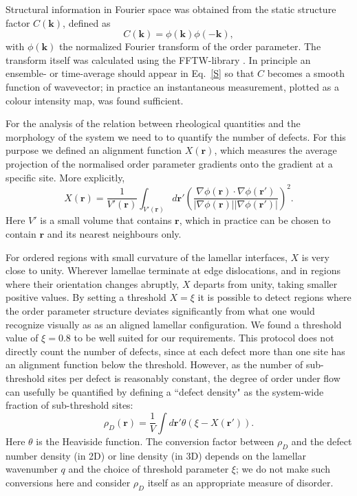 \documentclass[8.5pt,twoside,twocolumn]{article}
\begin{document}
Structural information in Fourier space was obtained from the static structure factor $C({\mathbf k})$, defined as
%
\begin{equation}
C({\mathbf k})=\phi({\mathbf k})\phi(-{\mathbf k}),
\label{S}\end{equation}
%
with $\phi({\mathbf k})$ the normalized Fourier transform of the order parameter.
The transform itself was calculated using the FFTW-library \cite{FFTW}.
In principle an ensemble- or time-average should appear in Eq.~\ref{S} so that $C$ becomes a smooth function of wavevector; in practice an instantaneous measurement, plotted as a colour intensity map, was found sufficient.

For the analysis of the relation between rheological quantities and the morphology of the system we need to to quantify the number of defects.
For this purpose we defined an alignment function $X({\mathbf r})$, which measures the average projection of the normalised order parameter gradients onto the gradient at a specific site.
More explicitly, 
%
\begin{equation}\label{alignment}
X({\mathbf r})=\frac{1}{V'({\mathbf r})} \int_{V'({\mathbf r})} d{\mathbf r'} \left(\frac{\nabla \phi ({\mathbf r}) \cdot \nabla \phi ({\mathbf r'})}{|\nabla\phi ({\mathbf r}) ||\nabla\phi ({\mathbf r'}) |}\right)^2. 
\end{equation}
%
Here $V'$ is a small volume that contains $\mathbf r$, which in practice can be chosen to contain $\mathbf r$ and its nearest neighbours only.

For ordered regions with small curvature of the lamellar interfaces, $X$ is very close to unity. Wherever lamellae terminate at edge dislocations, and in regions where their orientation changes abruptly, $X$ departs from unity, taking smaller positive values.
By setting a threshold $X=\xi$ it is possible to detect regions where the order parameter structure deviates significantly from what one would recognize visually as as an aligned lamellar configuration.
We found a threshold value of $\xi=0.8$ to be well suited for our requirements. This protocol does not directly count the number of defects, since at each defect more than one site has an alignment function below the threshold.
However, as the number of sub-threshold sites per defect is reasonably constant, the degree of order under flow can usefully be quantified by defining a ``defect density" as the system-wide fraction of sub-threshold sites:
%
\begin{equation}\label{defect density}
\rho_D({\mathbf r})=\frac{1}{V} \int d{\mathbf r'} \theta(\xi-X(\mathbf r')).  
\end{equation}
%
Here $\theta$ is the Heaviside function. The conversion factor between $\rho_D$ and the defect number density (in 2D) or line density (in 3D) depends on the lamellar wavenumber $q$ and the choice of threshold parameter $\xi$; we do not make such conversions here and consider $\rho_D$ itself as an appropriate measure of disorder.
\end{document}
